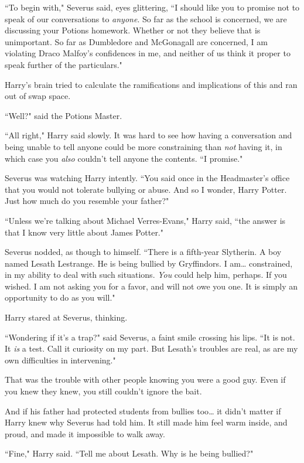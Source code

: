 ``To begin with," Severus said, eyes glittering, ``I should like you to promise not to speak of our conversations to \emph{anyone}. So far as the school is concerned, we are discussing your Potions homework. Whether or not they believe that is unimportant. So far as Dumbledore and McGonagall are concerned, I am violating Draco Malfoy's confidences in me, and neither of us think it proper to speak further of the particulars."

Harry's brain tried to calculate the ramifications and implications of this and ran out of swap space.

``Well?" said the Potions Master.

``All right," Harry said slowly. It was hard to see how having a conversation and being unable to tell anyone could be more constraining than \emph{not} having it, in which case you \emph{also} couldn't tell anyone the contents. ``I promise."

Severus was watching Harry intently. ``You said once in the Headmaster's office that you would not tolerate bullying or abuse. And so I wonder, Harry Potter. Just how much do you resemble your father?"

``Unless we're talking about Michael Verres-Evans," Harry said, ``the answer is that I know very little about James Potter."

Severus nodded, as though to himself. ``There is a fifth-year Slytherin. A boy named Lesath Lestrange. He is being bullied by Gryffindors. I am{\ldots} constrained, in my ability to deal with such situations. \emph{You} could help him, perhaps. If you wished. I am not asking you for a favor, and will not owe you one. It is simply an opportunity to do as you will."

Harry stared at Severus, thinking.

``Wondering if it's a trap?" said Severus, a faint smile crossing his lips. ``It is not. It \emph{is} a test. Call it curiosity on my part. But Lesath's troubles are real, as are my own difficulties in intervening."

That was the trouble with other people knowing you were a good guy. Even if you knew they knew, you still couldn't ignore the bait.

And if his father had protected students from bullies too{\ldots} it didn't matter if Harry knew why Severus had told him. It still made him feel warm inside, and proud, and made it impossible to walk away.

``Fine," Harry said. ``Tell me about Lesath. Why is he being bullied?"

